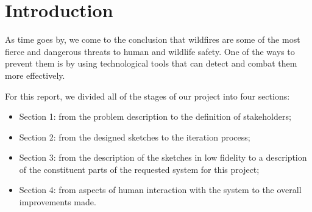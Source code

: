 \chapter{Introduction} \label{intro}
As time goes by, we come to the conclusion that wildfires are 
some of the most fierce and dangerous threats to human and 
wildlife safety. One of the ways to prevent them is by using 
technological tools that can detect and combat them more 
effectively. \par 
For this report, we divided all of the stages of our project 
into four sections: 
\begin{itemize}
    \item Section 1: from the problem description to the 
    definition of stakeholders;
    \item Section 2: from the designed sketches to the iteration 
    process;
    \item Section 3: from the description of the sketches in low fidelity 
    to a description of the constituent parts of the requested 
    system for this project; 
    \item Section 4: from aspects of human interaction with the 
    system to the overall improvements made.
\end{itemize}
